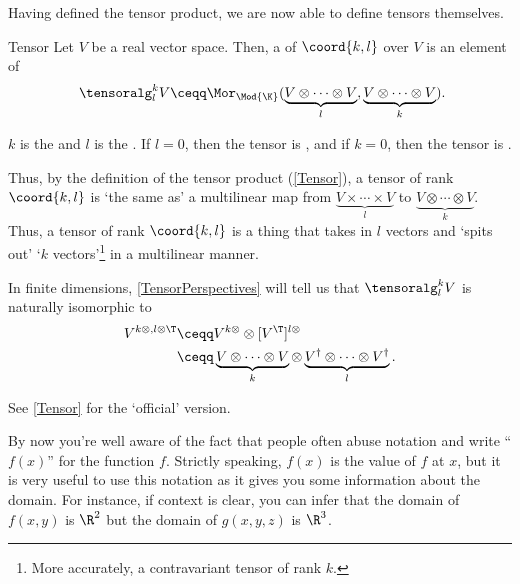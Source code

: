 Having defined the tensor product, we are now able to define tensors themselves.
\begin{dfn}{Tensor}{}
	Let $V$ be a real vector space.  Then, a  of  $\coord{k,l}$ over $V$ is an element of
	\begin{equation}\
	\tensoralg _l^kV\ceqq \Mor _{\Mod{\K}}(\underbrace{V\otimes \cdots \otimes V}_l,\underbrace{V\otimes \cdots \otimes V}_k).
	\end{equation}
	\begin{rmk}
		$k$ is the  and $l$ is the .  If $l=0$, then the tensor is , and if $k=0$, then the tensor is .
	\end{rmk}
	\begin{rmk}
		Thus, by the definition of the tensor product (\cref{Tensor}), a tensor of rank $\coord{k,l}$ is `the same as' a multilinear map from $\underbrace{V\times \cdots \times V}_l$ to $\underbrace{V\otimes \cdots \otimes V}_k$.  Thus, a tensor of rank $\coord{k,l}$ is a thing that takes in $l$ vectors and `spits out' `$k$ vectors'\footnote{More accurately, a contravariant tensor of rank $k$.} in a multilinear manner.
	\end{rmk}
	\begin{rmk}
		In finite dimensions, \cref{TensorPerspectives} will tell us that $\tensoralg _l^kV$ is naturally isomorphic to
		\begin{equation}
		\begin{split}
			V^{k\otimes ,l\otimes \T} & \ceqq V^{k\otimes}\otimes [V^{\T}]^{l\otimes} \\
			& \ceqq \underbrace{V\otimes \cdots \otimes V}_k\otimes \underbrace{V^{\dagger}\otimes \cdots \otimes V^{\dagger}}_l.
			\end{split}
		\end{equation}
	\end{rmk}
	\begin{rmk}
		See \cref{Tensor} for the `official' version.
	\end{rmk}
\end{dfn}
By now you're well aware of the fact that people often abuse notation and write ``$f(x)$'' for the function $f$.  Strictly speaking, $f(x)$ is the value of $f$ at $x$, but it is very useful to use this notation as it gives you some information about the domain.  For instance, if context is clear, you can infer that the domain of $f(x,y)$ is $\R ^2$ but the domain of $g(x,y,z)$ is $\R ^3$.

